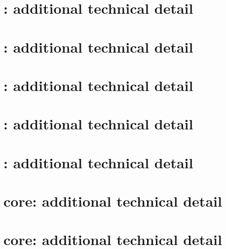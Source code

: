 \documentclass[preprint]{iacrtrans}
\begin{document}

\appendix

\clearpage
\section{:       additional technical detail}
\label{sec:pseudo:v1}

\clearpage
\section{:       additional technical detail}
\label{sec:pseudo:v2}

\clearpage
\section{:       additional technical detail}
\label{sec:pseudo:v3}

\clearpage
\section{:       additional technical detail}
\label{sec:pseudo:v4}

\clearpage
\section{:       additional technical detail}
\label{sec:pseudo:v5}


\clearpage
\section{\mbox{} core: additional technical detail}
\label{sec:core:2}

\clearpage
\section{\mbox{} core: additional technical detail}
\label{sec:core:1}


%

\end{document}
